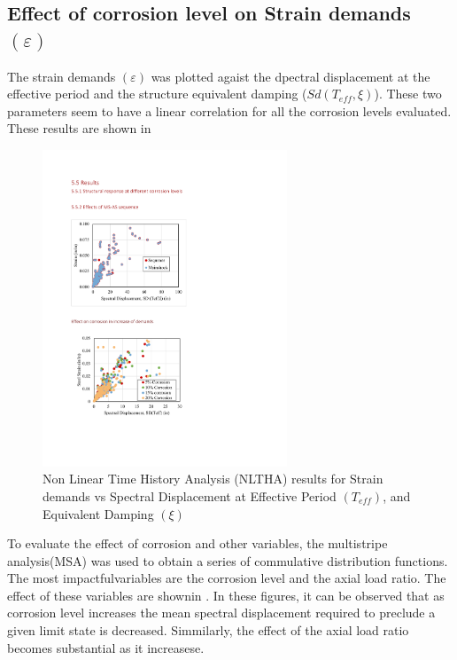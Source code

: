 \subsection{Effect of corrosion level on Strain demands $(\varepsilon)$}

The strain demands $(\varepsilon)$ was plotted agaist the dpectral displacement at the effective period and the structure equivalent damping ($Sd(T_{eff},\xi)$). These two parameters seem to have a linear correlation for all the corrosion levels evaluated. These results are shown in 

\begin{figure}[htbp]
	\centering
	\includegraphics[width=0.65\textwidth]{VAC Thesis 2.0/Chapter-5/figs/All_results_NLTHA_Figure.pdf}
	\caption{Non Linear Time History Analysis (NLTHA) results for Strain demands vs Spectral Displacement at Effective Period $(T_{eff})$, and Equivalent Damping $(\xi)$}
	\label{fig:all_results_nltha}
\end{figure}

To evaluate the effect of corrosion and other variables, the multistripe analysis(MSA) was used to obtain a series of commulative distribution functions. The most impactfulvariables are the corrosion level and the axial load ratio. The effect of these variables are shownin . In these figures, it can be observed that as corrosion level increases the mean spectral displacement required to preclude a given limit state is decreased. Simmilarly, the effect of the axial load ratio becomes substantial as it increasese.

